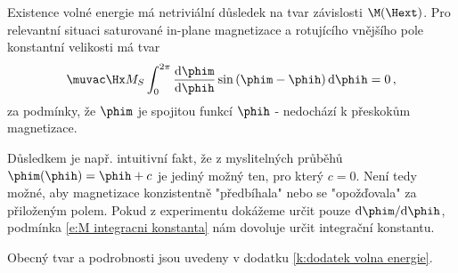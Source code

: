 Existence volné energie má netriviální důsledek na tvar závislosti $\M(\Hext)$.
Pro relevantní situaci saturované in-plane magnetizace a rotujícího vnějšího pole konstantní velikosti má tvar
\begin{equation} \label{e:M integracni konstanta}
\muvac\Hx M_S \int_{0}^{2\pi}  \frac{\text{d}\phim}{\text{d}\phih} \sin\left(\phim-\phih\right) \text{d}\phih=0 \,,
\end{equation}
za podmínky, že $\phim$ je spojitou funkcí $\phih$ - nedochází k přeskokům magnetizace.

Důsledkem je např. intuitivní fakt, že z myslitelných průběhů $\phim(\phih)=\phih+c$ je jediný možný ten, pro který $c=0$. 
Není tedy možné, aby magnetizace konzistentně "předbíhala" nebo se "opožďovala" za přiloženým polem. 
Pokud z experimentu dokážeme určit pouze $\text{d}\phim/\text{d}\phih$, podmínka \eqref{e:M integracni konstanta} nám dovoluje určit integrační konstantu.

Obecný tvar a podrobnosti jsou uvedeny v dodatku \ref{k:dodatek volna energie}.